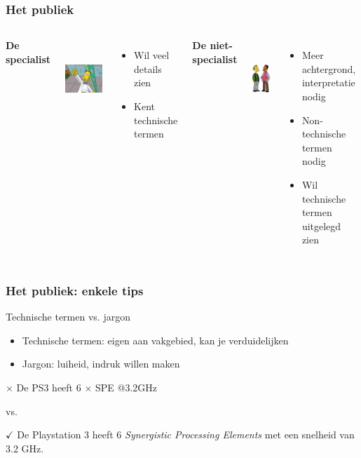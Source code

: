 \documentclass[aspectratio=169]{beamer}
\begin{document}
\begin{frame}
  \frametitle{Het publiek}

  \begin{columns}[c]

    \centering

    \textbf{De specialist}

    \includegraphics[height=3cm]{img/oef2-04.png}

    \begin{itemize}
      \item Wil veel details zien
      \item Kent technische termen
    \end{itemize}


    \centering

    \textbf{De niet-specialist}

    \includegraphics[height=3cm]{img/oef2-05}

    \begin{itemize}
      \item Meer achtergrond, interpretatie nodig
      \item Non-technische termen nodig
      \item Wil technische termen uitgelegd zien
    \end{itemize}
  \end{columns}
\end{frame}

\begin{frame}
  \frametitle{Het publiek: enkele tips}

  Technische termen vs. jargon

  \begin{itemize}
    \item Technische termen: eigen aan vakgebied, kan je verduidelijken
    \item Jargon: luiheid, indruk willen maken
  \end{itemize}

  \vfill

  \centering

  \textcolor{hgorange}{$\times$ De PS3 heeft 6 $\times$ SPE @3.2GHz}

  vs.

  \textcolor{hgdarkgreen}{$\checkmark$ De Playstation 3 heeft 6 \emph{Synergistic Processing Elements} met een snelheid van 3.2 GHz.}
\end{frame}
\end{document}
